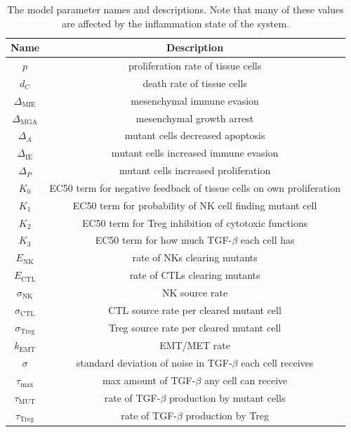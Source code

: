 \documentclass[11pt]{article}
\begin{document}
\begin{table}[H]
\begin{center}
 \begin{tabular}{|| c | c||} 
 \hline
 {\bf Name} & {\bf Description}  \\ [0.5ex] 
 \hline
 $p$ & proliferation rate of tissue cells \\ 
 \hline
 $d_C$  & death rate of tissue cells \\
 \hline
$\Delta_\text{MIE}$ &  mesenchymal immune evasion \\
 \hline
 $\Delta_\text{MGA}$ & mesenchymal growth arrest    \\
 \hline
  $\Delta_A$ & mutant cells decreased apoptosis  \\
  \hline
  $\Delta_\text{IE}$ & mutant cells increased immune evasion  \\
  \hline
  $\Delta_P$ & mutant cells increased proliferation  \\
  \hline
 $K_0$ & EC50 term for negative feedback of tissue cells on own proliferation\\
 \hline
 $K_1$ & EC50 term for probability of NK cell finding mutant cell\\
 \hline
  $K_2$ & EC50 term for Treg inhibition of cytotoxic functions  \\
  \hline
  $K_3$ & EC50 term for how much TGF-$\beta$ each cell has \\
  \hline
 $E_\text{NK}$ & rate of NKs clearing mutants  \\
  \hline
  $E_\text{CTL}$ & rate of CTLs clearing mutants \\
  \hline
  $\sigma_\text{NK}$ & NK source rate \\ 
  \hline
  $\sigma_\text{CTL}$ & CTL source rate per cleared mutant cell \\ 
  \hline
  $\sigma_\text{Treg}$ & Treg source rate per cleared mutant cell \\ 
  \hline
  $k_\text{EMT}$ & EMT/MET rate  \\
  \hline
  $\sigma$ & standard deviation of noise in TGF-$\beta$ each cell receives  \\
  \hline
 $\tau_\text{max}$ & max amount of TGF-$\beta$ any cell can receive \\
  \hline 
 $\tau_\text{MUT}$ & rate of TGF-$\beta$ production by mutant cells\\
  \hline
 $\tau_\text{Treg}$ & rate of TGF-$\beta$ production by Treg\\
  \hline
\end{tabular}
  \caption{The model parameter names and descriptions. Note that many of these values are affected by the inflammation state of the system.}
\end{center}
\end{table}
\end{document}
